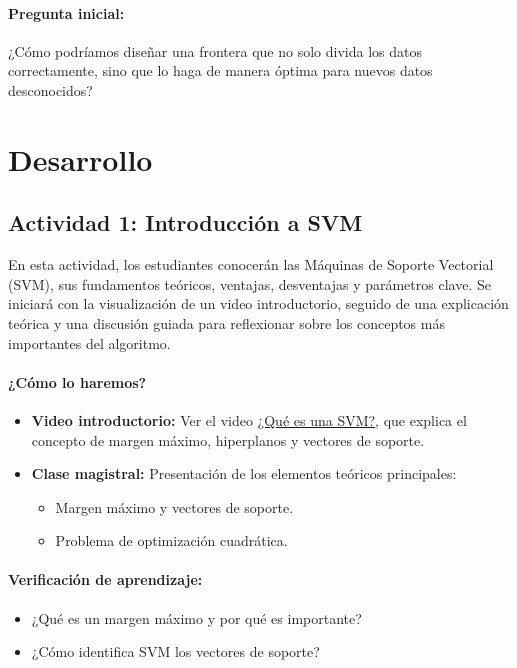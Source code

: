 \documentclass[a4,11pt]{aleph-notas}
\begin{document}
\paragraph{Pregunta inicial:}  
¿Cómo podríamos diseñar una frontera que no solo divida los datos correctamente, sino que lo haga de manera óptima para nuevos datos desconocidos?

\section*{Desarrollo}  

\subsection*{Actividad 1: Introducción a SVM}  

En esta actividad, los estudiantes conocerán las Máquinas de Soporte Vectorial (SVM), sus fundamentos teóricos, ventajas, desventajas y parámetros clave. Se iniciará con la visualización de un video introductorio, seguido de una explicación teórica y una discusión guiada para reflexionar sobre los conceptos más importantes del algoritmo.

\paragraph{¿Cómo lo haremos?}  
\begin{itemize}[leftmargin=*]  
    \item \textbf{Video introductorio:}  
    Ver el video \href{https://www.youtube.com/watch?v=jo9slrXKKNo}{¿Qué es una SVM?}, que explica el concepto de margen máximo, hiperplanos y vectores de soporte.  
    \item \textbf{Clase magistral:}  
    Presentación de los elementos teóricos principales:  
    \begin{itemize}  
        \item Margen máximo y vectores de soporte.  
        \item Problema de optimización cuadrática.  
    \end{itemize}  
\end{itemize}  

\paragraph{Verificación de aprendizaje:}  
\begin{itemize}[leftmargin=*]  
    \item ¿Qué es un margen máximo y por qué es importante?  
    \item ¿Cómo identifica SVM los vectores de soporte?  
\end{itemize}  
\end{document}

